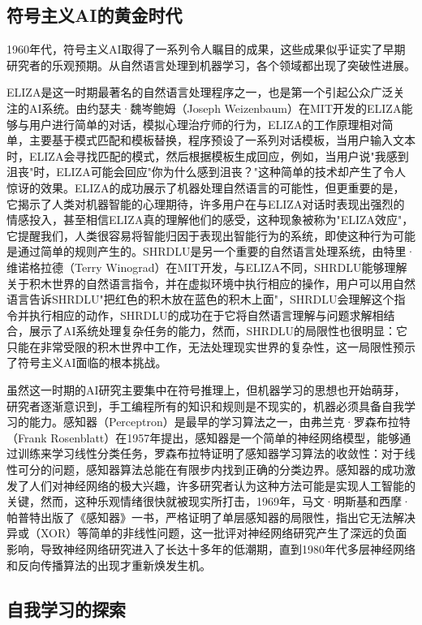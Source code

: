 \subsection{符号主义AI的黄金时代}

1960年代，符号主义AI取得了一系列令人瞩目的成果，这些成果似乎证实了早期研究者的乐观预期。从自然语言处理到机器学习，各个领域都出现了突破性进展。

ELIZA是这一时期最著名的自然语言处理程序之一，也是第一个引起公众广泛关注的AI系统。由约瑟夫·魏岑鲍姆（Joseph Weizenbaum）在MIT开发的ELIZA能够与用户进行简单的对话，模拟心理治疗师的行为，ELIZA的工作原理相对简单，主要基于模式匹配和模板替换，程序预设了一系列对话模板，当用户输入文本时，ELIZA会寻找匹配的模式，然后根据模板生成回应，例如，当用户说"我感到沮丧"时，ELIZA可能会回应"你为什么感到沮丧？"这种简单的技术却产生了令人惊讶的效果。ELIZA的成功展示了机器处理自然语言的可能性，但更重要的是，它揭示了人类对机器智能的心理期待，许多用户在与ELIZA对话时表现出强烈的情感投入，甚至相信ELIZA真的理解他们的感受，这种现象被称为"ELIZA效应"，它提醒我们，人类很容易将智能归因于表现出智能行为的系统，即使这种行为可能是通过简单的规则产生的。SHRDLU是另一个重要的自然语言处理系统，由特里·维诺格拉德（Terry Winograd）在MIT开发，与ELIZA不同，SHRDLU能够理解关于积木世界的自然语言指令，并在虚拟环境中执行相应的操作，用户可以用自然语言告诉SHRDLU"把红色的积木放在蓝色的积木上面"，SHRDLU会理解这个指令并执行相应的动作，SHRDLU的成功在于它将自然语言理解与问题求解相结合，展示了AI系统处理复杂任务的能力，然而，SHRDLU的局限性也很明显：它只能在非常受限的积木世界中工作，无法处理现实世界的复杂性，这一局限性预示了符号主义AI面临的根本挑战。

虽然这一时期的AI研究主要集中在符号推理上，但机器学习的思想也开始萌芽，研究者逐渐意识到，手工编程所有的知识和规则是不现实的，机器必须具备自我学习的能力。感知器（Perceptron）是最早的学习算法之一，由弗兰克·罗森布拉特（Frank Rosenblatt）在1957年提出，感知器是一个简单的神经网络模型，能够通过训练来学习线性分类任务，罗森布拉特证明了感知器学习算法的收敛性：对于线性可分的问题，感知器算法总能在有限步内找到正确的分类边界。感知器的成功激发了人们对神经网络的极大兴趣，许多研究者认为这种方法可能是实现人工智能的关键，然而，这种乐观情绪很快就被现实所打击，1969年，马文·明斯基和西摩·帕普特出版了《感知器》一书，严格证明了单层感知器的局限性，指出它无法解决异或（XOR）等简单的非线性问题，这一批评对神经网络研究产生了深远的负面影响，导致神经网络研究进入了长达十多年的低潮期，直到1980年代多层神经网络和反向传播算法的出现才重新焕发生机。\

\subsection{自我学习的探索}


